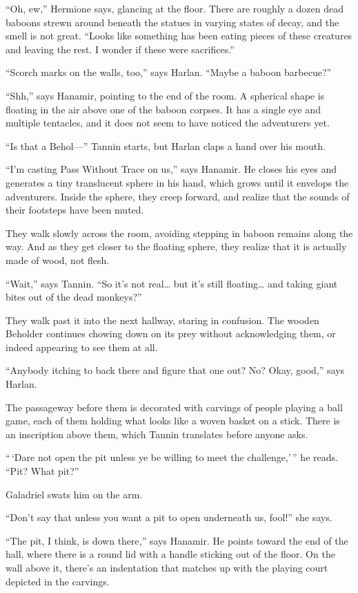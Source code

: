 \documentclass[smalldemyvopaper,11pt,twoside,onecolumn,openright,extrafontsizes]{memoir}
\begin{document}
``Oh, ew,'' Hermione says, glancing at the floor. There are roughly a
dozen dead baboons strewn around beneath the statues in varying states
of decay, and the smell is not great. ``Looks like something has been
eating pieces of these creatures and leaving the rest. I wonder if these
were sacrifices.''

``Scorch marks on the walls, too,'' says Harlan. ``Maybe a baboon
barbecue?''

``Shh,'' says Hanamir, pointing to the end of the room. A spherical
shape is floating in the air above one of the baboon corpses. It has a
single eye and multiple tentacles, and it does not seem to have noticed
the adventurers yet.

``Is that a Behol---'' Tannin starts, but Harlan claps a hand over his
mouth.

``I'm casting Pass Without Trace on us,'' says Hanamir. He closes his
eyes and generates a tiny translucent sphere in his hand, which grows
until it envelops the adventurers. Inside the sphere, they creep
forward, and realize that the sounds of their footsteps have been muted.

They walk slowly across the room, avoiding stepping in baboon remains
along the way. And as they get closer to the floating sphere, they
realize that it is actually made of wood, not flesh.

``Wait,'' says Tannin. ``So it's not real\ldots{} but it's still
floating\ldots{} and taking giant bites out of the dead monkeys?''

They walk past it into the next hallway, staring in confusion. The
wooden Beholder continues chowing down on its prey without acknowledging
them, or indeed appearing to see them at all.

``Anybody itching to back there and figure that one out? No? Okay,
good,'' says Harlan.

The passageway before them is decorated with carvings of people playing
a ball game, each of them holding what looks like a woven basket on a
stick. There is an inscription above them, which Tannin translates
before anyone asks.

``\,`Dare not open the pit unless ye be willing to meet the
challenge,'\,'' he reads. ``Pit? What pit?''

Galadriel swats him on the arm.

``Don't say that unless you want a pit to open underneath us, fool!''
she says.

``The pit, I think, is down there,'' says Hanamir. He points toward the
end of the hall, where there is a round lid with a handle sticking out
of the floor. On the wall above it, there's an indentation that matches
up with the playing court depicted in the carvings.
\end{document}
